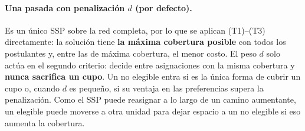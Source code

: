 \documentclass{article}
\begin{document}
\paragraph{Una pasada con penalización $d$ (por defecto).} Es un único SSP sobre la red completa, por lo que se aplican (T1)--(T3) directamente: la solución tiene \textbf{la máxima cobertura posible} con todos los postulantes y, entre las de máxima cobertura, el menor costo. El peso $d$ solo actúa en el segundo criterio: decide entre asignaciones con la misma cobertura y \textbf{nunca sacrifica un cupo}. Un no elegible entra si es la única forma de cubrir un cupo o, cuando $d$ es pequeño, si su ventaja en las preferencias supera la penalización. Como el SSP puede reasignar a lo largo de un camino aumentante, un elegible puede moverse a otra unidad para dejar espacio a un no elegible si eso aumenta la cobertura.
\end{document}
